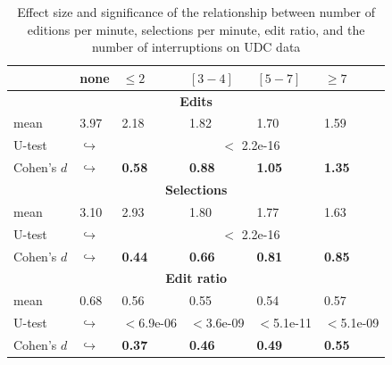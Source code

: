 \documentclass[times]{smrauth}
\begin{document}
\begin{table}[ht!]
\tiny
\renewcommand{\arraystretch}{1.3}
\caption{Effect size and significance of the relationship between number of editions per minute, selections per minute, edit ratio, and the number of interruptions on UDC data} 
\label{tbl:p_value_udc}
\centering
\begin{tabular}{l | p{0.75cm} | p{1cm} | p{1cm} | p{1cm} |p{1cm}} 

   & none & $\leq 2$ & $[3 - 4]$ & $[5 - 7]$ & $\geq 7$  \\  
  \hline
  \multicolumn{6}{c}{\textbf{Edits}} \\
  \hline
  mean & 3.97 &	2.18 & 1.82 & 1.70 & 1.59 \\ 
   \cline{3-6} 
  U-test & $\hookrightarrow$ & \multicolumn{4}{c}{$<$ 2.2e-16} \\
  \cline{3-6} 
  Cohen's $d$ & $\hookrightarrow$	& \textbf{0.58} & \textbf{0.88} & \textbf{1.05} & \textbf{1.35}    \\
  \hline
  
  
  \multicolumn{6}{c}{\textbf{Selections}} \\
  \hline 
  mean & 3.10 &	2.93 & 1.80 & 1.77 & 1.63  \\ 
     \cline{3-6} 
    U-test & $\hookrightarrow$ & \multicolumn{4}{c}{$<$ 2.2e-16} \\
    
  \cline{3-6} 
  Cohen's $d$ & $\hookrightarrow$	& \textbf{0.44} & \textbf{0.66} & \textbf{0.81} & \textbf{0.85} \\  
\hline


  \multicolumn{6}{c}{\textbf{Edit ratio}} \\
  \hline 
  mean & 0.68 & 0.56 & 0.55 & 0.54 & 0.57 \\ 
  \cline{3-6} 
     \cline{3-6} 
    U-test & $\hookrightarrow$ & $<$6.9e-06 & $<$3.6e-09 & $<$5.1e-11 & $<$5.1e-09  \\
    \cline{3-6} 
    Cohen's $d$ & $\hookrightarrow$ & \textbf{0.37} & \textbf{0.46} & \textbf{0.49} & \textbf{0.55} \\ 
\hline

\end{tabular}
\end{table}
\end{document}
